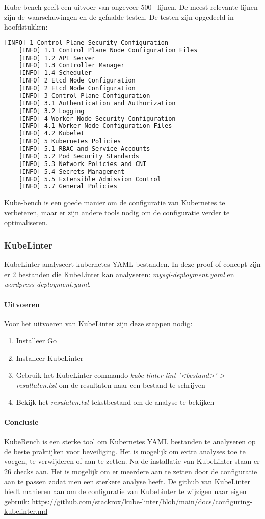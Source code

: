 Kube-bench geeft een uitvoer van ongeveer 500~ lijnen. De meest relevante lijnen zijn de waarschuwingen en de gefaalde testen. De testen zijn opgedeeld in hoofdstukken:
\begin{lstlisting}[language=tex, caption={INFO lijnen kube-bench}]
    [INFO] 1 Control Plane Security Configuration
    [INFO] 1.1 Control Plane Node Configuration Files
    [INFO] 1.2 API Server
    [INFO] 1.3 Controller Manager
    [INFO] 1.4 Scheduler
    [INFO] 2 Etcd Node Configuration
    [INFO] 2 Etcd Node Configuration
    [INFO] 3 Control Plane Configuration
    [INFO] 3.1 Authentication and Authorization
    [INFO] 3.2 Logging
    [INFO] 4 Worker Node Security Configuration
    [INFO] 4.1 Worker Node Configuration Files
    [INFO] 4.2 Kubelet
    [INFO] 5 Kubernetes Policies
    [INFO] 5.1 RBAC and Service Accounts
    [INFO] 5.2 Pod Security Standards
    [INFO] 5.3 Network Policies and CNI
    [INFO] 5.4 Secrets Management
    [INFO] 5.5 Extensible Admission Control
    [INFO] 5.7 General Policies
\end{lstlisting}

Kube-bench is een goede manier om de configuratie van Kubernetes te verbeteren, maar er zijn andere tools nodig om de configuratie verder te optimaliseren. 

\subsubsection{KubeLinter}
KubeLinter analyseert kubernetes YAML bestanden. In deze proof-of-concept zijn er 2 bestanden die KubeLinter kan analyseren: \textit{mysql-deployment.yaml} en \textit{wordpress-deployment.yaml}. 

\paragraph{Uitvoeren}
Voor het uitvoeren van KubeLinter zijn deze stappen nodig:
\begin{enumerate}
    \item Installeer Go
    \item Installeer KubeLinter
    \item Gebruik het KubeLinter commando \textit{kube-linter lint '<bestand>' > resultaten.txt} om de resultaten naar een bestand te schrijven
    \item Bekijk het \textit{resulaten.txt} tekstbestand om de analyse te bekijken
\end{enumerate}

\paragraph{Conclusie}
KubeBench is een sterke tool om Kubernetes YAML bestanden te analyseren op de beste praktijken voor beveiliging. Het is mogelijk om extra analyses toe te voegen, te verwijderen of aan te zetten. Na de installatie van KubeLinter staan er 26 checks aan. Het is mogelijk om er meerdere aan te zetten door de configuratie aan te passen zodat men een sterkere analyse heeft. De github van KubeLinter biedt manieren aan om de configuratie van KubeLinter te wijzigen naar eigen gebruik: \url{https://github.com/stackrox/kube-linter/blob/main/docs/configuring-kubelinter.md}


